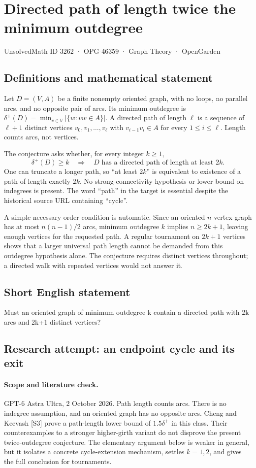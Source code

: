 \documentclass[11pt,a4paper]{article}
\begin{document}
\section*{Directed path of length twice the minimum outdegree}\label{3262}
{\small UnsolvedMath ID 3262 · OPG-46359 · Graph Theory · OpenGarden}
\subsection{Definitions and mathematical statement}
Let $D=(V,A)$ be a finite nonempty oriented graph, with no loops, no
parallel arcs, and no opposite pair of arcs. Its minimum outdegree is
$\delta^+(D)=\min_{v\in V}|\{w:vw\in A\}|$. A directed path of length
$\ell$ is a sequence of $\ell+1$ distinct vertices
$v_0,v_1,\ldots,v_\ell$ with $v_{i-1}v_i\in A$ for every
$1\le i\le\ell$. Length counts arcs, not vertices.

The conjecture asks whether, for every integer $k\ge1$,
\[
       \delta^+(D)\ge k
       \quad\Longrightarrow\quad
       D\text{ has a directed path of length at least }2k.
\]
One can truncate a longer path, so ``at least $2k$'' is equivalent to
existence of a path of length exactly $2k$. No strong-connectivity
hypothesis or lower bound on indegrees is present. The word ``path''
in the target is essential despite the historical source URL containing
``cycle''.

A simple necessary order condition is automatic. Since an oriented
$n$-vertex graph has at most $n(n-1)/2$ arcs, minimum outdegree $k$
implies $n\ge2k+1$, leaving enough vertices for the requested path.
A regular tournament on $2k+1$ vertices shows that a larger universal
path length cannot be demanded from this outdegree hypothesis alone.
The conjecture requires distinct vertices throughout; a directed walk
with repeated vertices would not answer it.
\subsection{Short English statement}
Must an oriented graph of minimum outdegree k contain a directed path with 2k arcs and 2k+1 distinct vertices?
\subsection{Research attempt: an endpoint cycle and its exit}
\paragraph{Scope and literature check.}
GPT-6 Astra Ultra, 2 October 2026. Path length counts arcs. There is no
indegree assumption, and an oriented graph has no opposite arcs.
Cheng and Keevash [S3] prove a path-length lower bound of
$1.5\delta^+$ in this class. Their counterexamples to a stronger
higher-girth variant do not disprove the present twice-outdegree
conjecture. The elementary argument below is weaker in general,
but it isolates a concrete cycle-extension mechanism, settles
$k=1,2$, and gives the full conclusion for tournaments.
\end{document}
